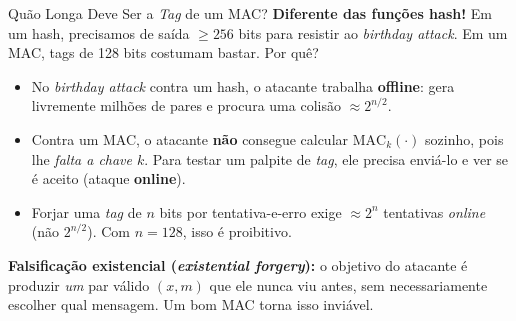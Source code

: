 \documentclass{beamer}
\begin{document}
\begin{frame}{Quão Longa Deve Ser a \textit{Tag} de um MAC?}
    \textbf{Diferente das funções hash!} Em um hash, precisamos de saída $\geq 256$ bits para resistir ao \textit{birthday attack}. Em um MAC, \alert{tags de 128 bits costumam bastar}. Por quê?
    \medskip
    \begin{itemize}
        \footnotesize
        \item No \textit{birthday attack} contra um hash, o atacante trabalha \textbf{offline}: gera livremente milhões de pares e procura uma colisão $\approx 2^{n/2}$.
        \item Contra um MAC, o atacante \textbf{não} consegue calcular $\text{MAC}_k(\cdot)$ sozinho, pois lhe \emph{falta a chave $k$}. Para testar um palpite de \textit{tag}, ele precisa enviá-lo e ver se é aceito (ataque \textbf{online}).
        \item Forjar uma \textit{tag} de $n$ bits por tentativa-e-erro exige $\approx 2^{n}$ tentativas \emph{online} (não $2^{n/2}$). Com $n = 128$, isso é proibitivo.
    \end{itemize}
    \medskip
    \begin{tcolorbox}[colback=blue!5,colframe=blue!50!black,boxrule=0.5pt]
        \footnotesize
        \textbf{Falsificação existencial (\textit{existential forgery}):} o objetivo do atacante é produzir \emph{um} par válido $(x, m)$ que ele nunca viu antes, sem necessariamente escolher qual mensagem. Um bom MAC torna isso inviável.
    \end{tcolorbox}
\end{frame}
\end{document}
